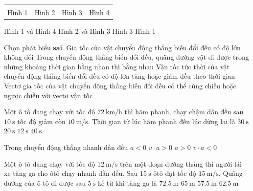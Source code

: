 \begin{ex}
\begin{center}
\begin{tabular}{M{4cm}M{4cm}M{4cm}M{4cm}}
\\
		Hình 1&Hình 2&Hình 3&Hình 4
	\end{tabular}
\end{center}	
	\choice
	{Hình 1 và Hình 4}
	{Hình 2 và Hình 3}
	{\True Hình 3}
	{Hình 1}
	\loigiai{}
\end{ex}
\begin{ex}
	Chọn phát biểu \textbf{sai}.
	\choice
	{Gia tốc của vật chuyển động thẳng biến đổi đều có độ lớn không đổi}
	{\True Trong chuyển động thẳng biến đổi đều, quãng đường vật đi được trong những khoảng thời gian bằng nhau thì bằng nhau}
	{Vận tốc tức thời của vật chuyển động thẳng biến đổi đều có độ lớn tăng hoặc giảm đều theo thời gian}
	{Vectơ gia tốc của vật chuyển động thẳng biến đổi đều có thể cùng chiều hoặc ngược chiều với vectơ vận tốc}
	\loigiai{}
\end{ex}
\begin{ex}
	Một ô tô đang chạy với tốc độ $\SI{72}{\kilo\meter/\hour}$ thì hãm phanh, chạy chậm dần đều sau $\SI{10}{\second}$ tốc độ giảm còn $\SI{10}{\meter/\second}$. Thời gian từ lúc hãm phanh đến lúc dừng lại là
	\choice
	{$\SI{30}{\second}$}
	{\True $\SI{20}{\second}$}
	{$\SI{12}{\second}$}
	{$\SI{40}{\second}$}
	\loigiai{}
\end{ex}
\begin{ex}
Trong chuyển động thẳng nhanh dần đều	
	\choice
	{$a<0$}
	{\True $v\cdot a>0$}
	{$ a>0$}
	{$v\cdot a<0$}
	\loigiai{}
\end{ex}
\begin{ex}
Một ô tô đang chạy với tốc độ $\SI{12}{\meter/\second}$ trên một đoạn đường thẳng thì người lái xe tăng
ga cho ôtô chạy nhanh dần đều. Sau $\SI{15}{\second}$ ôtô đạt tốc độ $\SI{15}{\meter/\second}$. Quãng đường của ô tô
đi được sau $\SI{5}{\second}$ kể từ khi tăng ga là	
	\choice
	{$\SI{72.5}{\meter}$}
	{$\SI{65}{\meter}$}
	{$\SI{57.5}{\meter}$}
	{\True $\SI{62.5}{\meter}$}
	\loigiai{}
\end{ex}
